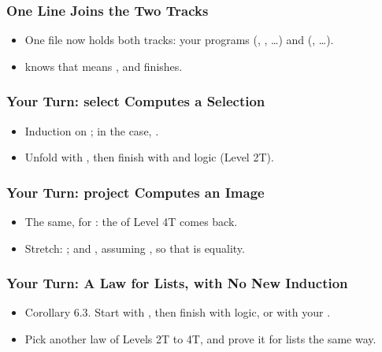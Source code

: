 \documentclass{ltx-talk}
\begin{document}

\begin{frame*}
  \frametitle{One Line Joins the Two Tracks}
  \begin{itemize}
    \item One file now holds both tracks: your programs (,
      , \ldots) and  (, \ldots).
    \item {} knows that  means , and finishes.
  \end{itemize}
\end{frame*}

\begin{frame*}
  \frametitle{Your Turn: select Computes a Selection}
  \begin{itemize}
    \item {} Induction on ; in the  case,
      .
    \item Unfold with , then finish with  and logic (Level 2T).
  \end{itemize}
\end{frame*}

\begin{frame*}
  \frametitle{Your Turn: project Computes an Image}
  \begin{itemize}
    \item {} The same, for : the  of Level 4T
      comes back.
    \item {} Stretch: ; and , assuming
      \code{[LawfulBEq α]}, so that \code{==} is equality.
  \end{itemize}
\end{frame*}

\begin{frame*}
  \frametitle{Your Turn: A Law for Lists, with No New Induction}
  \begin{itemize}
    \item {} Corollary 6.3. Start with , then finish with logic, or with
      your .
    \item {} Pick another law of Levels 2T to 4T, and prove it for
      lists the same way.
  \end{itemize}
\end{frame*}
\end{document}
